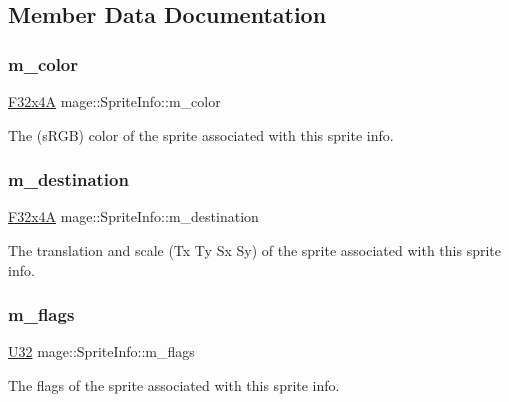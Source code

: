 \subsection{Member Data Documentation}
\hypertarget{structmage_1_1_sprite_info_ac2da3c6930c0682a3854f22a47a9a406}{}\label{structmage_1_1_sprite_info_ac2da3c6930c0682a3854f22a47a9a406} 
\subsubsection{\texorpdfstring{m\+\_\+color}{m\_color}}
{\footnotesize\ttfamily \hyperlink{namespacemage_a0b6ac82244eb3edc5eb66c88a3ddef13}{F32x4A} mage\+::\+Sprite\+Info\+::m\+\_\+color}

The (s\+R\+GB) color of the sprite associated with this sprite info. \hypertarget{structmage_1_1_sprite_info_a297e27f13e1a0cc0d150658e8a0233b9}{}\label{structmage_1_1_sprite_info_a297e27f13e1a0cc0d150658e8a0233b9} 
\subsubsection{\texorpdfstring{m\+\_\+destination}{m\_destination}}
{\footnotesize\ttfamily \hyperlink{namespacemage_a0b6ac82244eb3edc5eb66c88a3ddef13}{F32x4A} mage\+::\+Sprite\+Info\+::m\+\_\+destination}

The translation and scale (Tx Ty Sx Sy) of the sprite associated with this sprite info. \hypertarget{structmage_1_1_sprite_info_a9f3802944651a58e02831e5f2cb4a53e}{}\label{structmage_1_1_sprite_info_a9f3802944651a58e02831e5f2cb4a53e} 
\subsubsection{\texorpdfstring{m\+\_\+flags}{m\_flags}}
{\footnotesize\ttfamily \hyperlink{namespacemage_a41c104c036fba3756a74e19f793eeaa1}{U32} mage\+::\+Sprite\+Info\+::m\+\_\+flags}

The flags of the sprite associated with this sprite info. \hypertarget{structmage_1_1_sprite_info_aea7fe05a8be92e45134bae349986c032}{}\label{structmage_1_1_sprite_info_aea7fe05a8be92e45134bae349986c032} 
